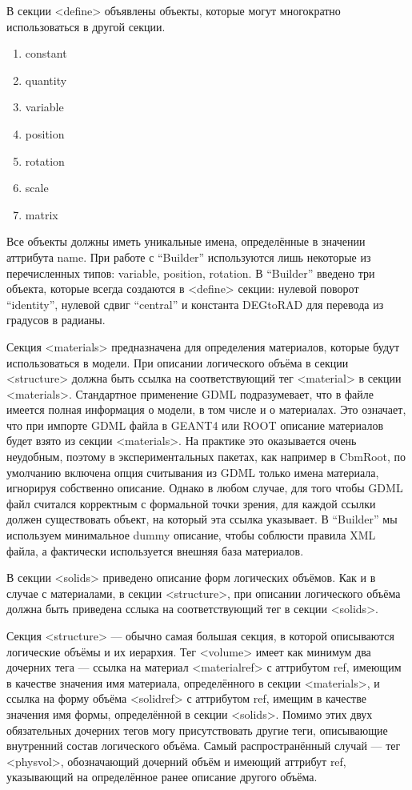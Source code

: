 В секции <define> объявлены объекты, которые могут многократно использоваться в другой секции.
\begin{enumerate}
\item constant
\item quantity
\item variable
\item position
\item rotation
\item scale
\item matrix
\end{enumerate}
Все объекты должны иметь уникальные имена, определённые в значении аттрибута name. При работе с ``Builder'' используются лишь некоторые из перечисленных типов: variable, position, rotation. В ``Builder'' введено три объекта, которые всегда создаются в <define> секции: нулевой поворот ``identity'', нулевой сдвиг ``central'' и константа DEGtoRAD для перевода из градусов в радианы.

Секция <materials> предназначена для определения материалов, которые будут использоваться в модели. При описании логического объёма в секции <structure> должна быть ссылка на соответствующий тег <material> в секции <materials>. Стандартное применение GDML подразумевает, что в файле имеется полная информация о модели, в том числе и о материалах. Это означает, что при импорте GDML файла в GEANT4 или ROOT описание материалов будет взято из секции <materials>. На практике это оказывается очень неудобным, поэтому в экспериментальных пакетах, как например в CbmRoot, по умолчанию включена опция считывания из GDML только имена материала, игнорируя собственно описание. Однако в любом случае, для того чтобы GDML файл считался корректным с формальной точки зрения, для каждой ссылки должен существовать объект, на который эта ссылка указывает. В ``Builder'' мы используем минимальное dummy \todo описание, чтобы соблюсти правила XML файла, а фактически используется внешняя база материалов.

В секции <solids> приведено описание форм логических объёмов. Как и в случае с материалами, в секции <structure>, при описании логического объёма должна быть приведена сслыка на соответствующий тег в секции <solids>.

Секция <structure> --- обычно самая большая секция, в которой описываются логические объёмы и их иерархия. Тег <volume> имеет как минимум два дочерних тега --- ссылка на материал <materialref> с аттрибутом ref, имеющим в качестве значения имя материала, определённого в секции <materials>, и ссылка на форму объёма <solidref> с аттрибутом ref, имещим в качестве значения имя формы, определённой в секции <solids>. Помимо этих двух обязательных дочерних тегов могу присутствовать другие теги, описывающие внутренний состав логического объёма. Самый распространённый случай --- тег <physvol>, обозначающий дочерний объём и имеющий аттрибут ref, указывающий на определённое ранее описание другого объёма.


